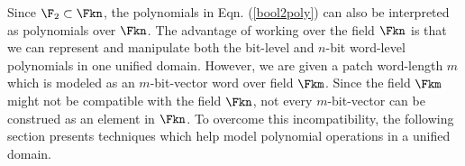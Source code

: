 Since $\F_2 \subset \Fkn$, the polynomials in Eqn. (\ref{bool2poly}) can also 
be interpreted as polynomials over $\Fkn$. The advantage of working over the 
field $\Fkn$ is that we can represent and manipulate both the bit-level
and $n$-bit word-level polynomials in one unified domain. However, we are 
given a patch word-length $m$ which is modeled as an $m$-bit-vector word over field $\Fkm$. 
Since the field $\Fkm$ might not be compatible with the field $\Fkn$, not every $m$-bit-vector 
can be construed as an element in $\Fkn$. 
To overcome this incompatibility, the following section presents techniques which help 
model polynomial operations in a unified domain.

\vspace{-0.12in}